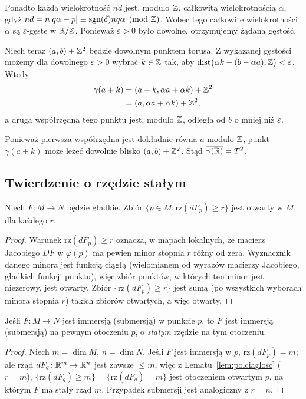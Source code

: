 \begin{uwaga}
Ponadto każda wielokrotność $nd$ jest,
modulo $\mathbb{Z}$, całkowitą wielokrotnością
$\alpha$, gdyż $nd=n|q\alpha-p| \equiv \operatorname{sgn}(\delta)nq\alpha \pmod{\mathbb{Z}}$.
Wobec tego całkowite wielokrotności
$\alpha$ są $\varepsilon$-gęste
w $\mathbb{R}/\mathbb{Z}$. Ponieważ $\varepsilon>0$
było dowolne, otrzymujemy żądaną gęstość.

Niech teraz $(a,b)+\mathbb{Z}^2$ będzie dowolnym
punktem torusa. Z wykazanej gęstości
możemy dla dowolnego $\varepsilon>0$
wybrać $k\in\mathbb{Z}$ tak, aby $\operatorname{dist} \bigl(\alpha k-(b-\alpha a),\mathbb{Z}\bigr) <\varepsilon$.
Wtedy
\[
\begin{aligned}
\gamma(a+k)
&=(a+k,\alpha a+\alpha k)+\mathbb{Z}^2\\
&=(a,\alpha a+\alpha k)+\mathbb{Z}^2,
\end{aligned}
\]
a druga współrzędna tego punktu jest,
modulo $\mathbb{Z}$, odległa od $b$ o mniej
niż $\varepsilon$.

Ponieważ pierwsza współrzędna jest
dokładnie równa $a$ modulo $\mathbb{Z}$,
punkt $\gamma(a+k)$ może leżeć
dowolnie blisko $(a,b)+\mathbb{Z}^2$.
Stąd $\overline{\gamma(\mathbb{R})}=T^2$.
\end{uwaga}


\subsection*{Twierdzenie o rzędzie stałym}

\begin{lemat}\label{lem:polciaglosc}
Niech $F\colon M\to N$ będzie gładkie. Zbiór $\{p\in M:\mathrm{rz}(dF_p)\geq r\}$ jest
otwarty w $M$, dla każdego $r$.
\end{lemat}
\begin{proof}
Warunek $\mathrm{rz}(dF_p)\geq r$ oznacza, w mapach lokalnych, że macierz Jacobiego $DF$ w
$\varphi(p)$ ma pewien minor stopnia $r$ różny od zera. Wyznacznik danego minora jest
funkcją ciągłą (wielomianem od wyrazów macierzy Jacobiego, gładkich funkcji punktu), więc
zbiór punktów, w których ten minor jest niezerowy, jest otwarty. Zbiór $\{\mathrm{rz}
(dF_p)\geq r\}$ jest sumą (po wszystkich wyborach minora stopnia $r$) takich zbiorów
otwartych, a więc otwarty.
\end{proof}

\begin{wniosek}\label{wn:stalyrzad}
Jeśli $F\colon M\to N$ jest immersją (submersją) w punkcie $p$, to $F$ jest immersją
(submersją) na pewnym otoczeniu $p$, o \emph{stałym} rzędzie na tym otoczeniu.
\end{wniosek}
\begin{proof}
Niech $m=\dim M$, $n=\dim N$. Jeśli $F$ jest immersją w $p$, $\mathrm{rz}(dF_p)=m$; ale
rząd $dF_q\colon\mathbb{R}^m\to\mathbb{R}^n$ jest zawsze $\leq m$, więc z Lematu~\ref{lem:polciaglosc}
($r=m$), $\{\mathrm{rz}(dF_q)\geq m\}=\{\mathrm{rz}(dF_q)=m\}$ jest otoczeniem otwartym
$p$, na którym $F$ ma stały rząd $m$. Przypadek submersji jest analogiczny z $r=n$.
\end{proof}

